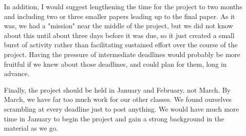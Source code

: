 \documentclass[12pt]{amsart}
\begin{document}
In addition, I would suggest lengthening the time for the project to two months and including two or three smaller papers leading up to the final paper. As it was, we had a "mission" near the middle of the project, but we did not know about this until about three days before it was due, so it just created a small burst of activity rather than facilitating sustained effort over the course of the project. Having the pressure of intermediate deadlines would probably be more fruitful if we knew about those deadlines, and could plan for them, long in advance.

Finally, the project should be held in January and February, not March. By March, we have far too much work for our other classes. We found ourselves scrambling at every deadline just to post anything. We would have much more time in January to begin the project and gain a strong background in the material as we go.
\end{document}
